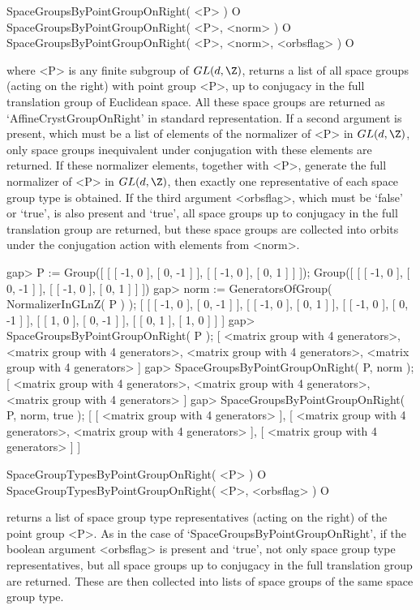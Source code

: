 
\>SpaceGroupsByPointGroupOnRight( <P> ) O
\>SpaceGroupsByPointGroupOnRight( <P>, <norm> ) O
\>SpaceGroupsByPointGroupOnRight( <P>, <norm>, <orbsflag> ) O

where <P> is any finite subgroup of $GL(d,\Z)$, returns a list of 
all space groups (acting on the right) with point group <P>, up to 
conjugacy in the full translation group of Euclidean space. All 
these space groups are returned as `AffineCrystGroupOnRight' in 
standard representation.  If a second argument is present, which must 
be a list of elements of the normalizer of <P> in $GL(d,\Z)$, only 
space groups inequivalent under conjugation with these elements are 
returned.  If these normalizer elements, together with <P>, generate 
the full normalizer of <P> in $GL(d,\Z)$, then exactly one 
representative of each space group type is obtained. 
If the third argument <orbsflag>, which must be `false' or `true',
is also present and `true', all space groups up to conjugacy in
the full translation group are returned, but these space groups are 
collected into orbits under the conjugation action with elements from
<norm>.

\beginexample
gap> P := Group([ [ [ -1, 0 ], [ 0, -1 ] ], [ [ -1, 0 ], [ 0, 1 ] ] ]);
Group([ [ [ -1, 0 ], [ 0, -1 ] ], [ [ -1, 0 ], [ 0, 1 ] ] ])
gap> norm := GeneratorsOfGroup( NormalizerInGLnZ( P ) );
[ [ [ -1, 0 ], [ 0, -1 ] ], [ [ -1, 0 ], [ 0, 1 ] ], [ [ -1, 0 ], [ 0, -1 ] ],
  [ [ 1, 0 ], [ 0, -1 ] ], [ [ 0, 1 ], [ 1, 0 ] ] ]
gap> SpaceGroupsByPointGroupOnRight( P );
[ <matrix group with 4 generators>, <matrix group with 4 generators>, 
  <matrix group with 4 generators>, <matrix group with 4 generators> ]
gap> SpaceGroupsByPointGroupOnRight( P, norm );
[ <matrix group with 4 generators>, <matrix group with 4 generators>, 
  <matrix group with 4 generators> ]
gap> SpaceGroupsByPointGroupOnRight( P, norm, true );
[ [ <matrix group with 4 generators> ], 
  [ <matrix group with 4 generators>, <matrix group with 4 generators> ], 
  [ <matrix group with 4 generators> ] ]
\endexample

\>SpaceGroupTypesByPointGroupOnRight( <P> ) O
\>SpaceGroupTypesByPointGroupOnRight( <P>, <orbsflag> ) O

returns a list of space group type representatives (acting on the right) 
of the point group <P>. As in the case of `SpaceGroupsByPointGroupOnRight',
if the boolean argument <orbsflag> is present and `true', not only space
group type representatives, but all space groups up to conjugacy in
the full translation group are returned. These are then collected 
into lists of space groups of the same space group type.

